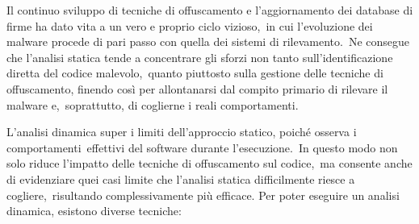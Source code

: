 Il continuo sviluppo di tecniche di offuscamento e l'aggiornamento dei database di firme ha dato vita a un vero e proprio ciclo vizioso,\
in cui l'evoluzione dei malware procede di pari passo con quella dei sistemi di rilevamento.\
Ne consegue che l'analisi statica tende a concentrare gli sforzi non tanto sull'identificazione diretta del codice malevolo,\
quanto piuttosto sulla gestione delle tecniche di offuscamento, finendo così per allontanarsi dal compito primario di rilevare il malware e,\
soprattutto, di coglierne i reali comportamenti.

L'analisi dinamica super i limiti dell'approccio statico, poiché osserva i comportamenti\
effettivi del software durante l'esecuzione.\
In questo modo non solo riduce l'impatto delle tecniche di offuscamento sul codice,\
ma consente anche di evidenziare quei casi limite che l'analisi statica difficilmente riesce a cogliere,\
risultando complessivamente più efficace.
Per poter eseguire un analisi dinamica, esistono diverse tecniche:

